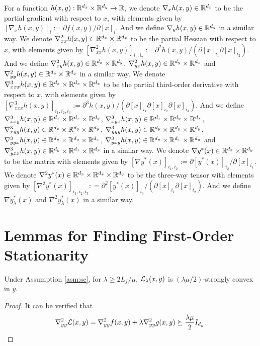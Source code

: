 For a function $h(x,y) : {\mathbb{R}}^{d_x} \times {\mathbb{R}}^{d_y} \rightarrow {\mathbb{R}}$,
we denote $\nabla_x h(x,y) \in {\mathbb{R}}^{d_x}$ to be the partial gradient with respect to $x$, with elements given by $ [\nabla_x h(x,y) ]_{i} := \partial f(x,y) / \partial [x]_{i}$. And we define $\nabla_y h(x,y) \in {\mathbb{R}}^{d_y}$ in a similar way.  We denote $ \nabla_{xx}^2 h(x,y) \in {\mathbb{R}}^{d_x} \times {\mathbb{R}}^{d_x}$ to be the partial Hessian with respect to $x$, with elements given by $ [\nabla_{xx}^2 h(x,y)]_{i_1,i_2} := \partial^2 h(x,y) / (\partial [x]_{i_1} \partial [x]_{i_2})$. And we define $ \nabla_{xy}^2 h(x,y) \in {\mathbb{R}}^{d_x} \times {\mathbb{R}}^{d_y} $, $\nabla_{yx}^2 h(x,y) \in {\mathbb{R}}^{d_y} \times {\mathbb{R}}^{d_x}$ and  $ \nabla_{yy}^2 h(x,y) \in {\mathbb{R}}^{d_y} \times {\mathbb{R}}^{d_y}$ in a similar way.  We denote $\nabla_{xxx}^3 h(x,y) \in {\mathbb{R}}^{d_x} \times {\mathbb{R}}^{d_x} \times {\mathbb{R}}^{d_x}$ to be the partial third-order derivative with respect to $x$, with elements given by 
$ [\nabla_{xxx}^3 h(x,y)]_{i_1,i_2,i_3} := \partial^3 h(x,y) / (\partial [x]_{i_1} \partial [x]_{i_2} \partial [x]_{i_3})$. And we define $\nabla_{xxy}^3 h(x,y) \in {\mathbb{R}}^{d_x} \times {\mathbb{R}}^{d_x} \times {\mathbb{R}}^{d_y}$, $\nabla_{xyx}^3 h(x,y) \in {\mathbb{R}}^{d_x} \times {\mathbb{R}}^{d_y} \times {\mathbb{R}}^{d_x}$,
$\nabla_{xyy}^3 h(x,y) \in {\mathbb{R}}^{d_x} \times {\mathbb{R}}^{d_y} \times {\mathbb{R}}^{d_y}$,
$\nabla_{yyy}^3 h(x,y) \in {\mathbb{R}}^{d_y} \times {\mathbb{R}}^{d_y} \times {\mathbb{R}}^{d_y}$,
$\nabla_{yyx}^3 h(x,y) \in {\mathbb{R}}^{d_y} \times {\mathbb{R}}^{d_y} \times {\mathbb{R}}^{d_x}$,
$\nabla_{yxy}^3 h(x,y) \in {\mathbb{R}}^{d_y} \times {\mathbb{R}}^{d_x} \times {\mathbb{R}}^{d_y}$
and$\nabla_{yxx}^3 h(x,y) \in {\mathbb{R}}^{d_y} \times {\mathbb{R}}^{d_x} \times {\mathbb{R}}^{d_x}$
in a similar way.
We denote $\nabla y^*(x) \in {\mathbb{R}}^{d_x} \times {\mathbb{R}}^{d_y} $ to be the matrix with elements given by $[\nabla y^*(x) ]_{i_1,i_2} :=  \partial [y^*(x)]_{i_2}/\partial [x]_{i_1}$. We denote $\nabla^2 y^*(x) \in {\mathbb{R}}^{d_x} \times {\mathbb{R}}^{d_x} \times {\mathbb{R}}^{d_y} $ to be the three-way tensor with elements given by $[\nabla^2 y^*(x)]_{i_1,i_2,i_3}: = \partial^2 [y^*(x)]_{i_3} / (\partial [x]_{i_1} \partial [x]_{i_2})$. And we define $\nabla y_{\lambda}^*(x)$ and $\nabla^2 y_{\lambda}^*(x)$ in a similar way.

\section{Lemmas for Finding First-Order Stationarity}

\begin{lem} \label{lem:Lag-sc}
Under Assumption \ref{asm:sc}, for $\lambda \ge 2L_f /\mu$,   ${\mathcal{L}}_{\lambda}(x,y)$ is  $(\lambda \mu/2)$-strongly convex in $y$.  
\end{lem}
\begin{proof}
It can be verified that
\begin{align*}
    \nabla_{yy}^2 {\mathcal{L}}(x,y) = \nabla_{yy}^2 f(x,y) +  \lambda \nabla_{yy}^2 g(x,y) \succeq \frac{\lambda \mu}{2} I_{d_y}.
\end{align*}
\end{proof}


